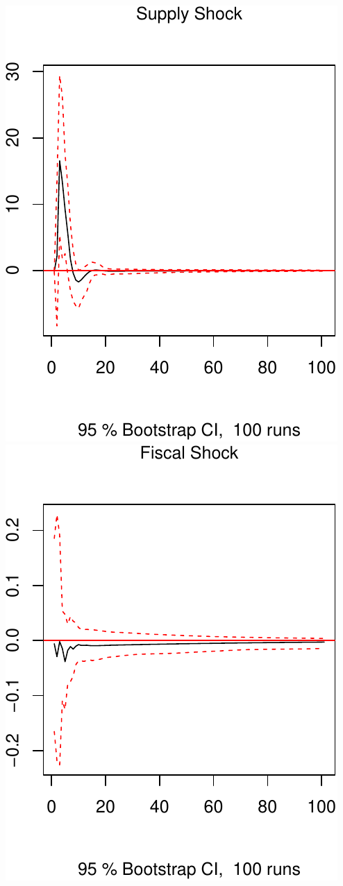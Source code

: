 \documentclass[11pt,preprint, authoryear]{elsarticle}
\numberwithin{equation}{section}
\numberwithin{figure}{section}
\numberwithin{table}{section}
\begin{document}
\includegraphics{TS_proj_files/figure-latex/unnamed-chunk-37-1.pdf}
\includegraphics{TS_proj_files/figure-latex/unnamed-chunk-37-2.pdf}
\end{document}

